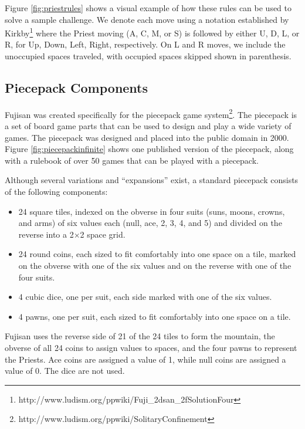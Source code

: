\documentclass[10pt,journal,compsoc]{IEEEtran}
\begin{document}
Figure \ref{fig:priestrules} shows a visual example of how these rules can be used to solve a sample challenge. We denote each move using a notation established by Kirkby\footnote{http://www.ludism.org/ppwiki/Fuji\_2dsan\_2fSolutionFour} where the Priest moving (A, C, M, or S) is followed by either U, D, L, or R, for Up, Down, Left, Right, respectively. On L and R moves, we include the unoccupied spaces traveled, with occupied spaces skipped shown in parenthesis.


\subsection{Piecepack Components}

Fujisan was created specifically for the piecepack game system\footnote{http://www.ludism.org/ppwiki/SolitaryConfinement}. The piecepack is a set of board game parts that can be used to design and play a wide variety of games. The piecepack was designed and placed into the public domain in 2000. Figure \ref{fig:piecepackinfinite} shows one published version of the piecepack, along with a rulebook of over 50 games that can be played with a piecepack.

Although several variations and ``expansions'' exist, a standard piecepack consists of the following components:
\begin{itemize}
\item 24 square tiles, indexed on the obverse in four suits (suns, moons, crowns, and arms) of six values each (null, ace, 2, 3, 4, and 5) and divided on the reverse into a 2$\times$2 space grid.
\item 24 round coins, each sized to fit comfortably into one space on a tile, marked on the obverse with one of the six values and on the reverse with one of the four suits.
\item 4 cubic dice, one per suit, each side marked with one of the six values.
\item 4 pawns, one per suit, each sized to fit comfortably into one space on a tile.
\end{itemize}

Fujisan uses the reverse side of 21 of the 24 tiles to form the mountain, the obverse of all 24 coins to assign values to spaces, and the four pawns to represent the Priests. Ace coins are assigned a value of 1, while null coins are assigned a value of 0. The dice are not used.
\end{document}
